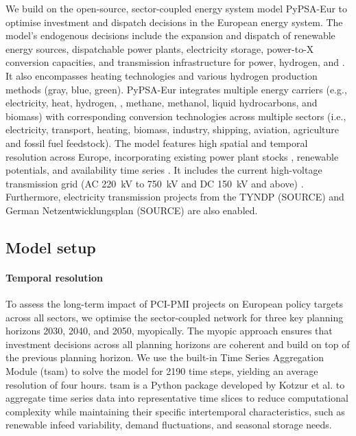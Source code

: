 \documentclass[preprint,12pt,sort&compress]{elsarticle}
\begin{document}
We build on the open-source, sector-coupled energy system model PyPSA-Eur \cite{neumannPotentialRoleHydrogen2023,frysztackiComparisonClusteringMethods2022,glaumOffshorePowerHydrogen2024,horschPyPSAEurOpenOptimisation2018} to optimise investment and dispatch decisions in the European energy system. The model's endogenous decisions include the expansion and dispatch of renewable energy sources, dispatchable power plants, electricity storage, power-to-X conversion capacities, and transmission infrastructure for power, hydrogen, and . It also encompasses heating technologies and various hydrogen production methods (gray, blue, green).
PyPSA-Eur integrates multiple energy carriers (e.g., electricity, heat, hydrogen, , methane, methanol, liquid hydrocarbons, and biomass) with corresponding conversion technologies across multiple sectors (i.e., electricity, transport, heating, biomass, industry, shipping, aviation, agriculture and fossil fuel feedstock). The model features high spatial and temporal resolution across Europe, incorporating existing power plant stocks \cite{gotzensPerformingEnergyModelling2019}, renewable potentials, and availability time series \cite{hofmannAtliteLightweightPython2021}. It includes the current high-voltage transmission grid (AC \SI{220}{kV} to \SI{750}{kV} and DC \SI{150}{kV} and above) \cite{xiongModellingHighvoltageGrid2025}. Furthermore, electricity transmission projects from the TYNDP (SOURCE) and German Netzentwicklungsplan (SOURCE) are also enabled.

\subsection{Model setup}
\label{sec:model_setup}


\paragraph{Temporal resolution}
\label{sec:temporal_resolution}
To assess the long-term impact of PCI-PMI projects on European policy targets across all sectors, we optimise the sector-coupled network for three key planning horizons 2030, 2040, and 2050, myopically. The myopic approach ensures that investment decisions across all planning horizons are coherent and build on top of the previous planning horizon. We use the built-in Time Series Aggregation Module (tsam) to solve the model for 2190 time steps, yielding an average resolution of four hours. tsam is a Python package developed by Kotzur et al. \cite{kotzurImpactDifferentTime2018} to aggregate time series data into representative time slices to reduce computational complexity while maintaining their specific intertemporal characteristics, such as renewable infeed variability, demand fluctuations, and seasonal storage needs.
\end{document}
